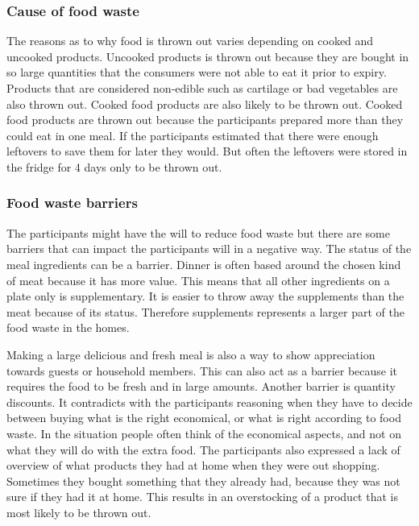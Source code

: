 \subsubsection{Cause of food waste} 
The reasons as to why food is thrown out varies depending on cooked and uncooked products. Uncooked products is thrown out because they are bought in so large quantities that the consumers were not able to eat it prior to expiry. Products that are considered non-edible such as cartilage or bad vegetables are also thrown out. Cooked food products are also likely to be thrown out. Cooked food products are thrown out because the participants prepared more than they could eat in one meal. If the participants estimated that there were enough leftovers to save them for later they would. But often the leftovers were stored in the fridge for 4 days only to be thrown out.

\subsubsection{Food waste barriers}
The participants might have the will to reduce food waste but there are some barriers that can impact the participants will in a negative way. The status  of the meal ingredients can be a barrier. Dinner is often based around the chosen kind of meat because it has more value. This means that all other ingredients on a plate only is supplementary. It is easier to throw away the supplements than the meat because of its status. Therefore supplements represents a larger part of the food waste in the homes.

Making a large delicious and fresh meal is also a way to show appreciation towards guests or household members. This can also act as a barrier because it requires the food to be fresh and in large amounts. Another barrier is quantity discounts. It contradicts with the participants reasoning when they have to decide between buying what is the right economical, or what is right according to food waste. In the situation people often think of the economical aspects, and not on what they will do with the extra food. The participants also expressed a lack of overview of what products they had at home when they were out shopping. Sometimes they bought something that they already had, because they was not sure if they had it at home. This results in an overstocking of a product that is most likely to be thrown out.


